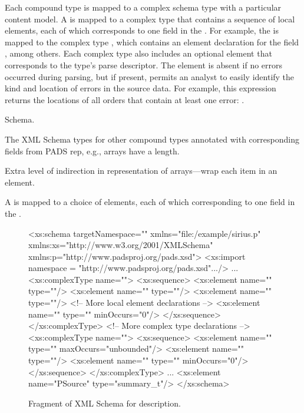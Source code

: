 Each compound type is mapped to a complex schema type with a
particular content model.  A  is mapped to a complex type
that contains a sequence of local elements, each of which corresponds
to one field in the .  For example, the 
 is mapped to the complex type
, which contains an element declaration for the
field , among others.  Each complex type also includes
an optional  element that corresponds to the type's parse
descriptor.  The  element is absent if no errors occurred
during parsing, but if present, permits an analyst to easily identify
the kind and location of errors in the source data.  For example, this
expression returns the locations of all orders that contain
at least one error: . 

Schema. 

The XML Schema types for other compound types annotated
with corresponding fields from PADS rep, e.g., arrays have a length. 


Extra level of indirection in representation of arrays---wrap each
item in an element. 

A  is mapped to a choice of elements, each of which
corresponding to one field in the . 


\begin{figure*}
\begin{small}
\begin{code}
<xs:schema targetNamespace=""
           xmlns="file:/example/sirius.p"
           xmlns:xs="http://www.w3.org/2001/XMLSchema"
           xmlns:p="http://www.padsproj.org/pads.xsd">
<xs:import namespace = "http://www.padsproj.org/pads.xsd".../>
...
<xs:complexType name="">
 <xs:sequence>
  <xs:element name=""     type=""/>
  <xs:element name="" type=""/>
  <xs:element name=""   type=""/>
  <!-- More local element declarations -->
  <xs:element name=""            type="" minOccurs="0"/>
 </xs:sequence>
</xs:complexType>
<!-- More complex type declarations -->
<xs:complexType name="">
 <xs:sequence>
  <xs:element name=""    type="" maxOccurs="unbounded"/>
  <xs:element name="" type=""/>
  <xs:element name=""     type="" minOccurs="0"/>
 </xs:sequence>
</xs:complexType>
...
<xs:element name="PSource" type="summary_t"/>
</xs:schema>
\end{code}
\end{small}
\caption{Fragment of XML Schema for \dibbler{} \pads{} description.}
\label{figure:dibbler-schema}
\end{figure*}

